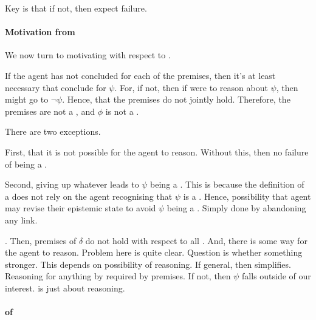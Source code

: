 \begin{note}
  Key is that if not, then expect failure.
\end{note}

\paragraph{Motivation from \support{}}

\begin{note}
  We now turn to motivating \ideaCS{} with respect to .
\end{note}

\begin{note}
  If the agent has not concluded for each of the premises, then it's at least necessary that conclude for \(\psi\).
  For, if not, then if were to reason about \(\psi\), then might go to \(\lnot\psi\).
  Hence, that the premises do not jointly hold.
  Therefore, the premises are not a \sink{}, and \(\phi\) is not a \sink{}.
\end{note}

\begin{note}
  There are two exceptions.

  First, that it is not possible for the agent to reason.
  Without this, then no failure of being a \sink{}.

  Second, giving up whatever leads to \(\psi\) being a \prequ{}.
  This is because the definition of a \prequ{} does not rely on the agent recognising that \(\psi\) is a \prequ{}.
  Hence, possibility that agent may revise their epistemic state to avoid \(\psi\) being a \prequ{}.
  Simply done by abandoning any link.
\end{note}

\begin{note}[\prequ{}]
  \prequ{}.
  Then, premises of \(\delta\) do not hold with respect to all .
  And, there is some way for the agent to reason.
  Problem here is quite clear.
  Question is whether something stronger.
  This depends on possibility of reasoning.
  If general, then simplifies.
  Reasoning for anything by required by premises.
  If not, then \(\psi\) falls outside of our interest.
   is just about reasoning.
\end{note}



\paragraph{ of }

